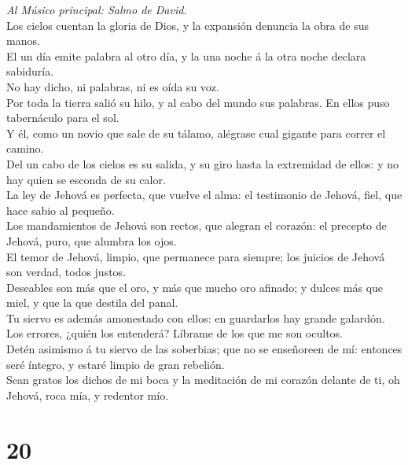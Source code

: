  \emph{Al Músico principal: Salmo de David.}\\
Los cielos cuentan la gloria de Dios, y la expansión denuncia la obra de
sus manos.\\
 El un día emite palabra al otro día, y la una noche á la
otra noche declara sabiduría.\\
 No hay dicho, ni palabras, ni es oída su voz.\\
 Por toda la tierra salió su hilo, y al cabo del mundo sus
palabras. En ellos puso tabernáculo para el sol.\\
 Y él, como un novio que sale de su tálamo, alégrase cual
gigante para correr el camino.\\
 Del un cabo de los cielos es su salida, y su giro hasta la
extremidad de ellos: y no hay quien se esconda de su calor.\\
 La ley de Jehová es perfecta, que vuelve el alma: el
testimonio de Jehová, fiel, que hace sabio al pequeño.\\
 Los mandamientos de Jehová son rectos, que alegran el
corazón: el precepto de Jehová, puro, que alumbra los ojos.\\
 El temor de Jehová, limpio, que permanece para siempre; los
juicios de Jehová son verdad, todos justos.\\
 Deseables son más que el oro, y más que mucho oro afinado;
y dulces más que miel, y que la que destila del panal.\\
 Tu siervo es además amonestado con ellos: en guardarlos
hay grande galardón.\\
 Los errores, ¿quién los entenderá? Líbrame de los que me
son ocultos.\\
 Detén asimismo á tu siervo de las soberbias; que no se
enseñoreen de mí: entonces seré íntegro, y estaré limpio de gran
rebelión.\\
 Sean gratos los dichos de mi boca y la meditación de mi
corazón delante de ti, oh Jehová, roca mía, y redentor mío.

\hypertarget{section-19}{%
\section{20}\label{section-19}}

